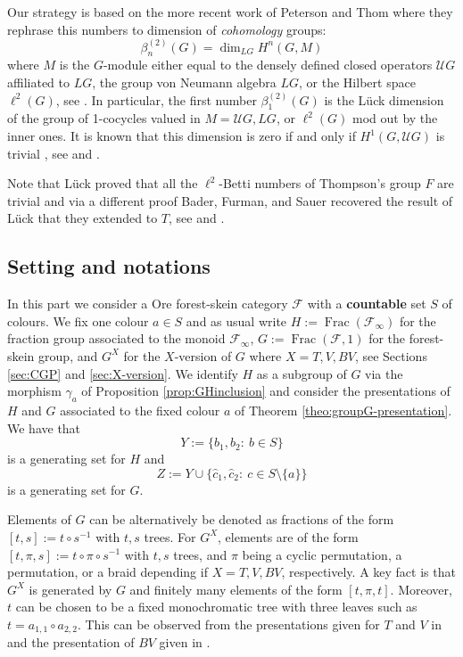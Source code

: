 \documentclass[a4paper, 12pt]{amsart}
\numberwithin{equation}{section}
\theoremstyle{definition}
\newcommand{\betti}{\beta^{(2)}_1}
\newcommand{\cF}{\mathcal F}
\DeclareMathOperator{\Frac}{Frac}
\newcommand{\cU}{\mathcal U}
\begin{document}
Our strategy is based on the more recent work of Peterson and Thom where they rephrase this numbers to dimension of {\it cohomology} groups: 
$$\beta_n^{(2)}(G)=\dim_{LG} H^n(G,M)$$
where $M$ is the $G$-module either equal to the densely defined closed operators $\cU G$ affiliated to $LG$, the group von Neumann algebra $LG$, or the Hilbert space $\ell^2(G)$, see \cite[Section 2]{Peterson-Thom11}.
In particular, the first number $\betti(G)$ is the L\"uck dimension of the group of 1-cocycles valued in $M=\cU G, LG$, or $\ell^2(G)$ mod out by the inner ones.
It is known that this dimension is zero if and only if $H^1(G,\cU G)$ is trivial
, see \cite{Thom08} and \cite[Section 2]{Peterson-Thom11}.

Note that L\"uck proved that all the $\ell^2$-Betti numbers of Thompson's group $F$ are trivial and via a different proof Bader, Furman, and Sauer recovered the result of L\"uck that they extended to $T$, see \cite[Theorem 7.10]{Luck02} and \cite[Theorem 1.8]{Bader-Furman-Sauer14}.

\subsection{Setting and notations}
In this part we consider a Ore forest-skein category $\cF$ with a {\bf countable} set $S$ of colours. 
We fix one colour $a\in S$ and as usual write $H:=\Frac(\cF_\infty)$ for the fraction group associated to the monoid $\cF_\infty$, $G:=\Frac(\cF,1)$ for the forest-skein group, and $G^X$ for the $X$-version of $G$ where $X=T,V,BV$, see Sections \ref{sec:CGP} and \ref{sec:X-version}.
We identify $H$ as a subgroup of $G$ via the morphism $\gamma_a$ of Proposition \ref{prop:GHinclusion} and consider the presentations of $H$ and $G$ associated to the fixed colour $a$ of Theorem \ref{theo:groupG-presentation}.
We have that 
$$Y:=\{b_1,b_2:\ b\in S\}$$
is a generating set for $H$ and 
$$Z:=Y\cup \{ \hat c_1,\hat c_2:\ c\in S\setminus\{a\}\}$$
is a generating set for $G$.

Elements of $G$ can be alternatively be denoted as fractions of the form $[t,s]:=t\circ s^{-1}$ with $t,s$ trees. 
For $G^X$, elements are of the form $[t,\pi,s]:= t\circ \pi \circ s^{-1}$ with $t,s$ trees, and $\pi$ being a cyclic permutation, a permutation, or a braid depending if $X=T,V,BV$, respectively.
A key fact is that $G^X$ is generated by $G$ and finitely many elements of the form $[t,\pi,t]$. Moreover, $t$ can be chosen to be a fixed monochromatic tree with three leaves such as $t=a_{1,1}\circ a_{2,2}.$
This can be observed from the presentations given for $T$ and $V$ in \cite{Cannon-Floyd-Parry96} and the presentation of $BV$ given in \cite{Brin-BV2}.
\end{document}
